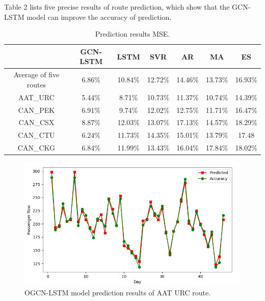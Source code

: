 \documentclass[journal,article,submit,moreauthors,pdftex]{Definitions/mdpi}
\begin{document}
\par Table 2 lists five precise results of route prediction, which show that the GCN-LSTM model can improve the accuracy of prediction.
\begin{table}[htbp]
    \centering
	\caption{Prediction results MSE.}
	\begin{tabular}{ccccccc}
		\toprule
		& GCN-LSTM	& LSTM  &  SVR  &  AR  &  MA  & ES\\
		\midrule
		Average of five routes	& 6.86\% & 10.84\%  &  12.72\% & 14.46\% & 13.73\%  &  16.93\%   \\
        AAT\_URC     & 5.44\% & 8.71\% & 10.73\% & 11.37\% & 10.74\% & 14.39\% \\
		CAN\_PEK		& 6.91\% & 9.74\% & 12.02\% & 12.75\% & 11.71\% & 16.47\% \\
        CAN\_CSX     & 8.87\% & 12.03\% & 13.07\% & 17.13\% & 14.57\% & 18.29\% \\
        CAN\_CTU     & 6.24\% & 11.73\% & 14.35\% & 15.01\% & 13.79\% & 17.48\\
        CAN\_CKG     & 6.84\% & 11.99\% & 13.43\% & 16.04\% & 17.84\% & 18.02\%\\
		\bottomrule
	\end{tabular}
\end{table}

\begin{figure}[htbp]
    \centering
    \includegraphics[width=12 cm]{./imgs/predicted.png}
    \caption{OGCN-LSTM model prediction results of AAT URC route.}
    \label{fig:predicted}
\end{figure}
\end{document}
